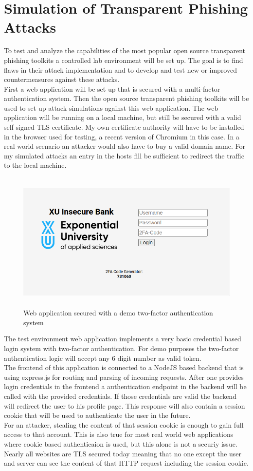 \documentclass[12pt]{scrbook}
\begin{document}
\section{Simulation of Transparent Phishing Attacks}
To test and analyze the capabilities of the most popular open source
transparent phishing toolkits a controlled lab environment will be set up. The
goal is to find flaws in their attack implementation and to develop and test new
or improved countermeasures against these attacks.\\ First a web application
will be set up that is secured with a multi-factor authentication system. Then
the open source transparent phishing toolkits will be used to set up attack
simulations against this web application. The web application will be
running on a local machine, but still be secured with a valid self-signed TLS
certificate. My own certificate authority will have to be installed in the
browser used for testing, a recent version of Chromium in this case. In a
real world scenario an attacker would also have to buy a valid domain name. For
my simulated attacks an entry in the hosts fill be sufficient to redirect the
traffic to the local machine.
\begin{figure}[!htb] \centering
	\includegraphics[height=7cm]{./images/2fa_app.png}
    \caption{Web application secured with a demo two-factor authentication system}
\end{figure}
The test environment web application implements a very basic credential based login
system with two-factor authentication. For demo purposes the two-factor
authentication logic will accept any 6 digit number as valid token.\\The
frontend of this application is connected to a NodeJS based backend that is
using express.js for routing and parsing of incoming requests. After one
provides login credentials in the frontend a authentication endpoint in the
backend will be called with the provided credentials. If those credentials are
valid the backend will redirect the user to his profile page. This response will
also contain a session cookie that will be used to authenticate the user in the
future.\\For an attacker, stealing the content of that session cookie is enough
to gain full access to that account. This is also true for most real world web
applications where cookie based authenticaion is used, but this alone is not a
securiy issue. Nearly all websites are TLS secured today meaning that no one except the user and server can see the content of that HTTP request including the session cookie.
\end{document}
